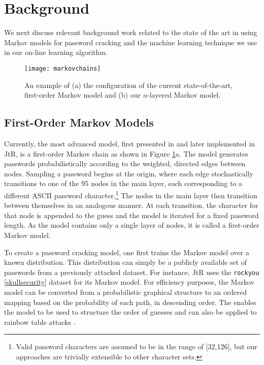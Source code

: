 \documentclass{acm_proc_article-sp}
\begin{document}
\section{Background}
\label{sec:background}

We next discuss relevant background work related to the state of the art in using Markov models for password cracking and the machine learning technique we use in our on-line learning algorithm.

\begin{figure}
  \centering
    \texttt{[image: markovchains]}
  \caption{An example of (a) the configuration of the current state-of-the-art, first-order Markov model and (b) our $n$-layered Markov model.}
  \label{fig:markovchains}
\end{figure}

\subsection{First-Order Markov Models}

Currently, the most advanced model, first presented in \cite{narayanan-ccs05} and later implemented in JtR, is a first-order Markov chain as shown in Figure \ref{fig:markovchains}a. The model generates passwords probabilistically according to the weighted, directed edges between nodes. Sampling a password begins at the origin, where each edge stochastically transitions to one of the 95 nodes in the main layer, each corresponding to a different ASCII password character.\footnote{Valid password characters are assumed to be in the range of [32,126], but our approaches are trivially extensible to other character sets.} The nodes in the main layer then transition between themselves in an analogous manner. At each transition, the character for that node is appended to the guess and the model is iterated for a fixed password length. As the model contains only a single layer of nodes, it is called a first-order Markov model.

To create a password cracking model, one first trains the Markov model over a known distribution. This distribution can simply be a publicly available set of passwords from a previously attacked dataset. For instance, JtR uses the \texttt{rockyou} \ref{skullsecurity} dataset for its Markov model. For efficiency purposes, the Markov model can be converted from a probabilistic graphical structure to an ordered mapping based on the probability of each path, in descending order. The enables the model to be used to structure the order of guesses and can also be applied to rainbow table attacks \cite{narayanan-ccs05}.
\end{document}
